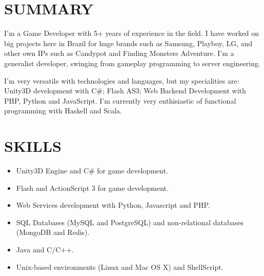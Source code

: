 \documentclass[line,margin]{res}
\begin{document}

\address{Rua Maria Callas, 63, Cond. Itas, Itapema-303 - Manaus, AM - Brazil}
\address{+55 11 999326440 - bruno@croci.me - \href{http://bruno.croci.me/}{http://bruno.croci.me/}}

 
\begin{resume}
 
\section{SUMMARY} I'm a Game Developer with 5+ years of experience in the field. I have worked on big projects here in Brazil for huge brands such as Samsung, Playboy, LG, and other own IPs such as Candypot and Finding Monsters Adventure. I'm a generalist developer, swinging from gameplay programming to server engineering.

I'm very versatile with technologies and languages, but my specialities are: Unity3D development with C\#; Flash AS3; Web Backend Development with PHP, Python and JavaScript. I'm currently very enthisiastic of functional programming with Haskell and Scala.
 
\section{SKILLS} \begin{itemize}  \itemsep 1.25pt
				 \item Unity3D Engine and C\# for game development.
				 \item Flash and ActionScript 3 for game development.
				 \item Web Services development with Python, Javascript and PHP.
				 \item SQL Databases (MySQL and PostgreSQL) and non-relational databases (MongoDB and Redis).
                 \item Java and C/C++.
                 \item Unix-based environments (Linux and Mac OS X) and ShellScript.
                 \end{itemize}
 

\end{resume}
\end{document}
